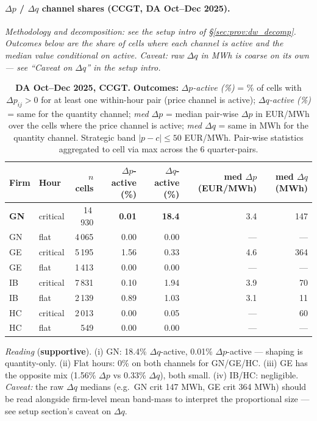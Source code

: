 \documentclass[11pt,a4paper]{article}
\begin{document}
\paragraph{$\Delta p$ / $\Delta q$ channel shares (CCGT, DA Oct--Dec 2025).}\label{sec:prov:dw_decomp_results}
\emph{Methodology and decomposition: see the setup intro of \S\ref{sec:prov:dw_decomp}. Outcomes below are the share of cells where each channel is active and the median value conditional on active. Caveat: raw $\Delta q$ in MWh is coarse on its own --- see ``Caveat on $\Delta q$'' in the setup intro.}

\begin{table}[H]
\centering
\caption{\textbf{DA Oct--Dec 2025, CCGT.} \textbf{Outcomes:} \emph{$\Delta p$-active (\%)} = \% of cells with $\Delta p_{ij} > 0$ for at least one within-hour pair (price channel is active); \emph{$\Delta q$-active (\%)} = same for the quantity channel; \emph{med $\Delta p$} = median pair-wise $\Delta p$ in EUR/MWh over the cells where the price channel is active; \emph{med $\Delta q$} = same in MWh for the quantity channel. Strategic band $|p - c| \le 50$ EUR/MWh. Pair-wise statistics aggregated to cell via max across the 6 quarter-pairs.}
\label{tab:dw_decomp}
\begin{tabular}{l l r r r r r}
\toprule
Firm & Hour & $n$ cells & $\Delta p$-active (\%) & $\Delta q$-active (\%) & med $\Delta p$ (EUR/MWh) & med $\Delta q$ (MWh) \\
\midrule
\textbf{GN} & critical & 14\,930 & \textbf{0.01} & \textbf{18.4} & 3.4 & 147 \\
GN & flat     &  4\,065 & 0.00 & 0.00 & --- & --- \\
\addlinespace
GE & critical &  5\,195 & 1.56 & 0.33 & 4.6 & 364 \\
GE & flat     &  1\,413 & 0.00 & 0.00 & --- & --- \\
\addlinespace
IB & critical &  7\,831 & 0.10 & 1.94 & 3.9 &  70 \\
IB & flat     &  2\,139 & 0.89 & 1.03 & 3.1 &  11 \\
\addlinespace
HC & critical &  2\,013 & 0.00 & 0.05 & --- &  60 \\
HC & flat     &    549 & 0.00 & 0.00 & --- & --- \\
\bottomrule
\end{tabular}
\end{table}

\textit{Reading} (\textbf{supportive}). (i) GN: 18.4\% $\Delta q$-active, 0.01\% $\Delta p$-active --- shaping is quantity-only. (ii) Flat hours: 0\% on both channels for GN/GE/HC. (iii) GE has the opposite mix (1.56\% $\Delta p$ vs 0.33\% $\Delta q$), both small. (iv) IB/HC: negligible. \emph{Caveat:} the raw $\Delta q$ medians (e.g.\ GN crit 147 MWh, GE crit 364 MWh) should be read alongside firm-level mean band-mass to interpret the proportional size --- see setup section's caveat on $\Delta q$.
\end{document}
